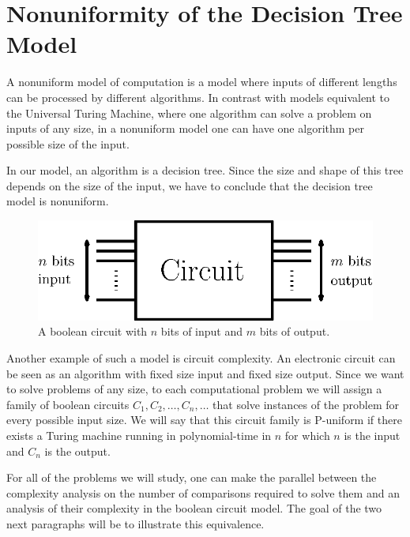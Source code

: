 \section{Nonuniformity of the Decision Tree Model}
\label{tree:sorting:nonuniformity}

A nonuniform model of computation is a model where inputs of different lengths
can be processed by different algorithms. In contrast with models equivalent to
the Universal Turing Machine, where one algorithm can solve a problem on inputs
of any size, in a nonuniform model one can have one algorithm per possible size
of the input.

In our model, an algorithm is a decision tree. Since the size and shape of
this tree depends on the size of the input, we have to conclude that the
decision tree model is nonuniform.

\begin{figure}
\center
\includegraphics[height=0.15\textheight]{fig/sorting/model/circuit}
\caption{A boolean circuit with \(n\) bits of input and \(m\) bits of output.}
\label{fig:sorting:nonuniformity:circuit}
\end{figure}

Another example of such a model is circuit complexity. An electronic circuit
can be seen as an algorithm with fixed size input and fixed size output. Since
we want to solve problems of any size, to each computational problem we will
assign a family of boolean circuits \(C_1,C_2,\ldots,C_n,\ldots\) that
solve instances of the problem for every possible input size. We will say that
this circuit family is P-uniform if there exists a Turing machine running in
polynomial-time in \(n\) for which \(n\) is the input and \(C_n\) is the output.

For all of the problems we will study, one can make the parallel between the
complexity analysis on the number of comparisons required to solve them and an
analysis of their complexity in the boolean circuit model. The goal of the two
next paragraphs will be to illustrate this equivalence.

